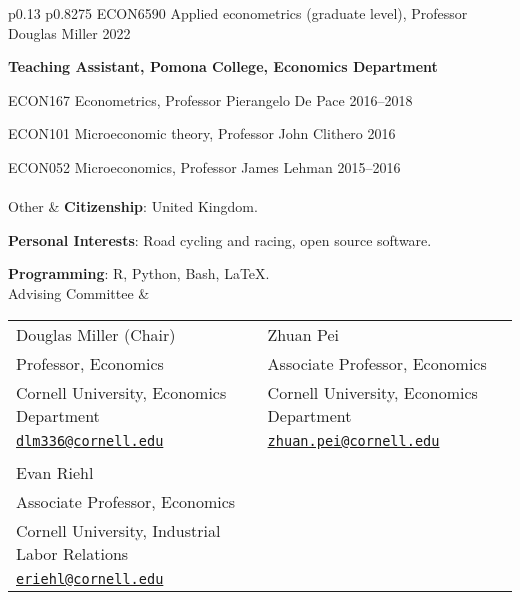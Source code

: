 \documentclass[letterpaper,11pt,oneside]{article}
\begin{document}
\begin{tabular}[\textwidth]{p{} p{}}
    ECON6590 Applied econometrics (graduate level), Professor Douglas Miller \hfill 2022

    \vspace{0.1cm}
    \textbf{Teaching Assistant, Pomona College, Economics Department}
    
    ECON167 Econometrics, Professor Pierangelo De Pace \hfill 2016--2018

    ECON101 Microeconomic theory, Professor John Clithero \hfill 2016

    ECON052 Microeconomics, Professor James Lehman \hfill 2015--2016 \\

\\[15ex]
\Large{Other}
    & \textbf{Citizenship}: United Kingdom.
    
    \textbf{Personal Interests}: Road cycling and racing, open source software.
    
    \textbf{Programming}: R, Python, Bash, \LaTeX. \vspace{0.2cm} \\

\Large{Advising Committee}
    & \begin{tabular}[t]{@{} l l}
        Douglas Miller (Chair)                   & Zhuan Pei                                \\
        Professor, Economics                     & Associate Professor, Economics           \\
        Cornell University, Economics Department & Cornell University, Economics Department \\
        \href{mailto:dlm336@cornell.edu}{\nolinkurl{dlm336@cornell.edu}}
            & \href{mailto:zhuan.pei@cornell.edu}{\nolinkurl{zhuan.pei@cornell.edu}}            \\ \\
        Evan Riehl                                     \\
        Associate Professor, Economics                 \\
        Cornell University, Industrial Labor Relations \\
        \href{mailto:eriehl@cornell.edu}{\nolinkurl{eriehl@cornell.edu}}
    \end{tabular}
\end{tabular}

\newpage
\onehalfspacing
\restoregeometry
{}
\end{document}
